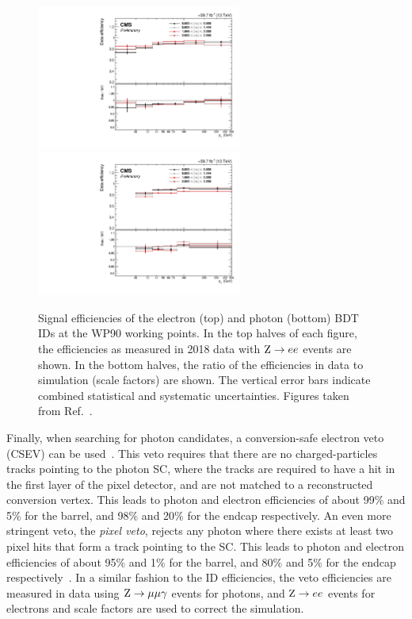 \begin{figure}
  \centering
  \includegraphics[width=0.60\textwidth]{Figures/Detector/CMS/electron_id_data_mc.pdf} \\
  \includegraphics[width=0.60\textwidth]{Figures/Detector/CMS/photon_id_data_mc.pdf}
  \caption[Signal Efficiencies of Electron and Photon Identification Algorithms for the WP90 Working Point, Measured in Data and Simulation]{Signal efficiencies of the electron (top) and photon (bottom) BDT IDs at the WP90 working points. In the top halves of each figure, the efficiencies as measured in 2018 data with $\mathrm{Z}\to ee$ events are shown. In the bottom halves, the ratio of the efficiencies in data to simulation (scale factors) are shown. The vertical error bars indicate combined statistical and systematic uncertainties. Figures taken from Ref.~\cite{CMS:2020uim}.}\label{fig:eg_id_data_mc}
\end{figure}

Finally, when searching for photon candidates, a conversion-safe electron veto (CSEV) can be used~\cite{CMS:2015myp}. This veto requires that there are no charged-particles tracks pointing to the photon SC, where the tracks are required to have a hit in the first layer of the pixel detector, and are not matched to a reconstructed conversion vertex. This leads to photon and electron efficiencies of about 99\% and 5\% for the barrel, and 98\% and 20\% for the endcap respectively. An even more stringent veto, the \textit{pixel veto}, rejects any photon where there exists at least two pixel hits that form a track pointing to the SC. This leads to photon and electron efficiencies of about 95\% and 1\% for the barrel, and 80\% and 5\% for the endcap respectively~\cite{CMS:2015myp}. In a similar fashion to the ID efficiencies, the veto efficiencies are measured in data using $\mathrm{Z}\to\mu\mu\gamma$ events for photons, and $\mathrm{Z}\to ee$ events for electrons and scale factors are used to correct the simulation.

